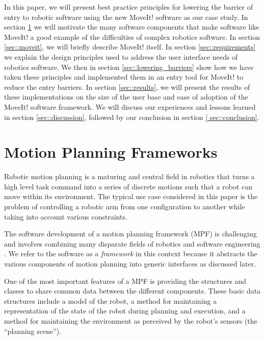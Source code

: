 \documentclass[10pt,journal,compsoc]{joser1}
\begin{document}
{In this paper, we will present best practice principles for lowering the barrier
of entry to robotic software using the new MoveIt! software \cite{moveit} as our
case study. In section \ref{sec::motion_planning} we will motivate the many
software components that make software like MoveIt! a good example of the
difficulties of complex robotics software. In section \ref{sec::moveit}, we will
briefly describe MoveIt! itself. In section \ref{sec::requirements} we explain
the design principles used to address the user interface needs of robotics
software. We then in section \ref{sec::lowering_barriers} show how we have taken these principles and implemented them
in an entry tool for MoveIt! to reduce the entry barriers. In section \ref{sec::results}, we will present the
results of these implementations on the size of the user base and ease of
adoption of the MoveIt! software framework. We will discuss our experiences and
lessons learned in section \ref{sec::discussion}, followed by our conclusion in
section \ref{
sec::conclusion}.

\section{Motion Planning Frameworks}
\label{sec::motion_planning}

Robotic motion planning is a maturing and central field in robotics
\cite{moll2011teaching} that turns a high level task command into a series of
discrete motions such that a robot can move within its environment. The typical
use case considered in this paper is the problem of controlling a robotic arm
from one configuration to another while taking into account various constraints.

The software development of a motion planning framework (MPF) is challenging and
involves combining many disparate fields of robotics and software engineering
\cite{perez2010roadmap}. We refer to the software as a \textit{framework} in
this context because it abstracts the various components of motion planning into
generic interfaces as discussed later.

One of the most important features of a MPF is providing the structures and
classes to share common data between the different components. These basic data
structures include a model of the robot, a method for maintaining a
representation of the state of the robot during planning and execution, and a
method for maintaining the environment as perceived by the robot's sensors (the
``planning scene'').

}
\end{document}
